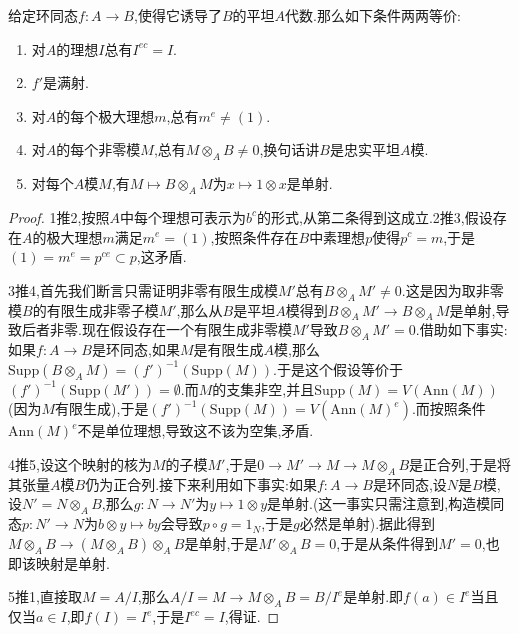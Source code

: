 \item 给定环同态$f:A\to B$,使得它诱导了$B$的平坦$A$代数.那么如下条件两两等价:
\begin{enumerate}
	\item 对$A$的理想$I$总有$I^{ec}=I$.
	\item $f'$是满射.
	\item 对$A$的每个极大理想$m$,总有$m^e\not=(1)$.
	\item 对$A$的每个非零模$M$,总有$M\otimes_AB\not=0$,换句话讲$B$是忠实平坦$A$模.
	\item 对每个$A$模$M$,有$M\mapsto B\otimes_AM$为$x\mapsto 1\otimes x$是单射.
\end{enumerate}
\begin{proof}
	
	1推2,按照$A$中每个理想可表示为$b^c$的形式,从第二条得到这成立.2推3,假设存在$A$的极大理想$m$满足$m^e=(1)$,按照条件存在$B$中素理想$p$使得$p^c=m$,于是$(1)=m^e=p^{ce}\subset p$,这矛盾.
	
	3推4,首先我们断言只需证明非零有限生成模$M'$总有$B\otimes_AM'\not=0$.这是因为取非零模$B$的有限生成非零子模$M'$,那么从$B$是平坦$A$模得到$B\otimes_AM'\to B\otimes_AM$是单射,导致后者非零.现在假设存在一个有限生成非零模$M'$导致$B\otimes_AM'=0$.借助如下事实:如果$f:A\to B$是环同态,如果$M$是有限生成$A$模,那么$\mathrm{Supp}(B\otimes_AM)=(f')^{-1}(\mathrm{Supp}(M))$.于是这个假设等价于$(f')^{-1}(\mathrm{Supp}(M'))=\emptyset$.而$M$的支集非空,并且$\mathrm{Supp}(M)=V(\mathrm{Ann}(M))$(因为$M$有限生成),于是$(f')^{-1}(\mathrm{Supp}(M))=V(\mathrm{Ann}(M)^e)$.而按照条件$\mathrm{Ann}(M)^e$不是单位理想,导致这不该为空集,矛盾.
	
	4推5,设这个映射的核为$M$的子模$M'$,于是$0\to M'\to M\to M\otimes_AB$是正合列,于是将其张量$A$模$B$仍为正合列.接下来利用如下事实:如果$f:A\to B$是环同态,设$N$是$B$模,设$N'=N\otimes_AB$,那么$g:N\to N'$为$y\mapsto 1\otimes y$是单射.(这一事实只需注意到,构造模同态$p:N'\to N$为$b\otimes y\mapsto by$会导致$p\circ g=1_N$,于是$g$必然是单射).据此得到$M\otimes_AB\to (M\otimes_AB)\otimes_AB$是单射,于是$M'\otimes_AB=0$,于是从条件得到$M'=0$,也即该映射是单射.
	
	5推1,直接取$M=A/I$,那么$A/I=M\to M\otimes_AB=B/I^e$是单射.即$f(a)\in I^e$当且仅当$a\in I$,即$f(I)=I^e$,于是$I^{ec}=I$,得证.
\end{proof}








